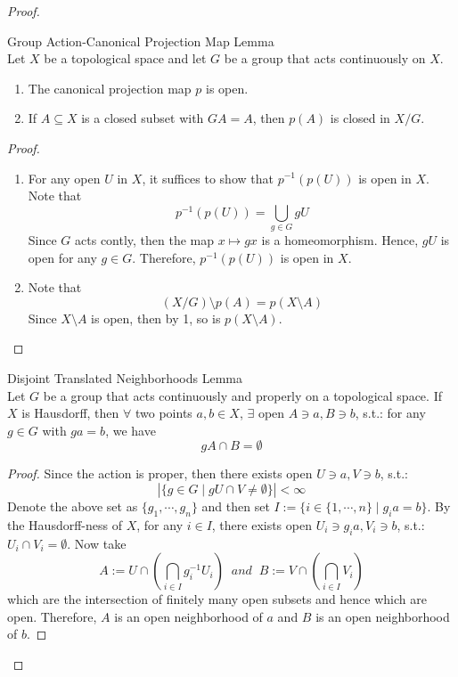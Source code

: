 \begin{proof}
    \begin{lemma}{Group Action-Canonical Projection Map Lemma}\\
    Let $X$ be a topological space and let $G$ be a group that acts continuously on $X$.
    \begin{enumerate}
        \item The canonical projection map $p$ is open.
        \item If $A \subseteq X$ is a closed subset with $GA =A$, then $p(A)$ is closed in $X /G$.
    \end{enumerate}
    \end{lemma}

    \begin{proof}
        \begin{enumerate}
            \item For any open $U$ in $X$, it suffices to show that $p^{-1}(p(U))$ is open in $X$. Note that
            $$p^{-1}(p(U)) = \bigcup_{g \in G} gU$$
            Since $G$ acts contly, then the map $x \mapsto gx$ is a homeomorphism. Hence, $gU$ is open for any $g \in G$. Therefore, $p^{-1}(p(U))$ is open in $X$.

            \item Note that $$(X/G) \setminus p(A) = p(X\setminus A)$$
            Since $X \setminus A$ is open, then by 1, so is $p(X\setminus A)$.
        \end{enumerate}
    \end{proof}

    \begin{lemma}{Disjoint Translated Neighborhoods Lemma}\\
    Let $G$ be a group that acts continuously and properly on a topological space. If $X$ is Hausdorff, then $\forall$ two points $a,b\in X$, $\exists$ open $A \ni a, B\ni b$, s.t.: for any $g \in G$ with $ga=b$, we have
    $$gA \cap B =\emptyset$$
    \end{lemma}

    \begin{proof}
        Since the action is proper, then there exists open $U \ni a,V \ni b$, s.t.:
        $$|\{ g \in G \mid gU \cap V \neq \emptyset \}| < \infty$$
        Denote the above set as $\{g_1 ,\cdots, g_n\}$ and then set $I:= \{ i \in \{1,\cdots, n\} \mid g_i a=b\}$. By the Hausdorff-ness of $X$, for any $i \in I$, there exists open $U_i \ni g_ia,V_i \ni b$, s.t.: $U_i \cap V_i = \emptyset$. Now take
        $$A:= U \cap (\bigcap_{i \in I} g^{-1}_i U_i) \;\;and\;\; B:= V \cap (\bigcap_{i \in I} V_i)$$
        which are the intersection of finitely many open subsets and hence which are open. Therefore, $A$ is an open neighborhood of $a$ and $B$ is an open neighborhood of $b$. 
        

\end{proof}
\end{proof}
